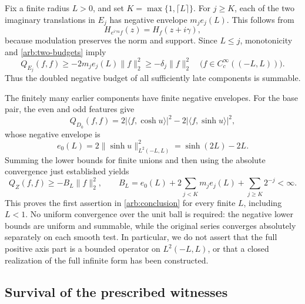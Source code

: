 Fix a finite radius \(L>0\), and set
\(K=\max\{1,\lceil L\rceil\}\). For \(j\ge K\), each
of the two imaginary translations in \(E_j\) has negative
envelope \(m_je_j(L)\). This follows from
\[
 H_{e^{i\gamma u}f}(z)=H_f(z+i\gamma),
\]
because modulation preserves the norm and support. Since
\(L\le j\), monotonicity and \eqref{arb:two-budgets} imply
\begin{equation}\label{arb:tail-lower}
 Q_{E_j}(f,f)\ge-2m_je_j(L)\|f\|_2^2
              \ge-\delta_j\|f\|_2^2
 \quad\bigl(f\in C_c^\infty((-L,L))\bigr).
\end{equation}
Thus the doubled negative budget of all sufficiently late
components is summable.

The finitely many earlier components have finite negative
envelopes. For the base pair, the even and odd features give
\[
 Q_{D_0}(f,f)=
 2|\langle f,\cosh u\rangle|^2
 -2|\langle f,\sinh u\rangle|^2,
\]
whose negative envelope is
\[
 e_0(L)=2\|\sinh u\|_{L^2(-L,L)}^2
                         =\sinh(2L)-2L.
\]
Summing the lower bounds for finite unions and then using the
absolute convergence just established yields
\begin{equation}\label{arb:finite-bottom}
 Q_Z(f,f)\ge-B_L\|f\|_2^2,
 \qquad
 B_L=e_0(L)+2\sum_{j<K}m_je_j(L)+\sum_{j\ge K}2^{-j}<\infty.
\end{equation}
This proves the first assertion in \eqref{arb:conclusion}
for every finite \(L\), including \(L<1\). No uniform
convergence over the unit ball is required: the negative
lower bounds are uniform and summable, while the original
series converges absolutely separately on each smooth test.
In particular, we do not assert that the full positive axis
part is a bounded operator on \(L^2(-L,L)\), or that a
closed realization of the full infinite form has been
constructed.

\subsection{Survival of the prescribed witnesses}

